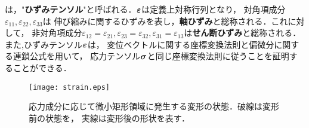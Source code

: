 \documentclass[10pt,a4j]{jarticle}
\begin{document}
は，"{\bf ひずみテンソル}"と呼ばれる．$\mbox{\boldmath $\varepsilon$}$は定義上対称行列となり，
対角項成分$\varepsilon_{11},\varepsilon_{22},\varepsilon_{33}$は
伸び縮みに関するひずみを表し，{\bf 軸ひずみ}と総称される．これに対して，
非対角項成分$\varepsilon_{12}=\varepsilon_{21},\varepsilon_{23}=\varepsilon_{32},
\varepsilon_{31}=\varepsilon_{13}$は{\bf せん断ひずみ}と総称される．
また,ひずみテンソル$\mbox{\boldmath $\varepsilon$}$は，
変位ベクトルに関する座標変換法則と偏微分に関する連鎖公式を用いて，
応力テンソル$\mbox{\boldmath $\sigma$}$と同じ座標変換法則に従うことを証明することができる．
\begin{figure}[h]
	\begin{center}
	\texttt{[image: strain.eps]} 
	\end{center}
	\caption{応力成分に応じて微小矩形領域に発生する変形の状態．破線は変形前の状態を，
	実線は変形後の形状を表す．} 
	\label{fig:fig3_1}
\end{figure}
\newpage
\end{document}
